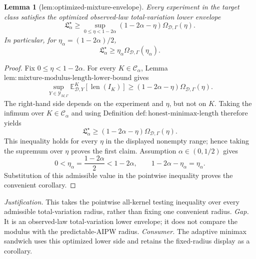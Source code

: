 \documentclass{article}
\newtheorem{lemma}{Lemma}
\begin{document}
\begin{lemma}[lem:optimized-mixture-envelope]\label{lem:optimized-mixture-envelope}
Every experiment in the target class satisfies the optimized observed-law total-variation lower envelope
\[
 \mathfrak L_\alpha^\star
 \ge
 \sup_{0\le\eta<1-2\alpha}
 (1-2\alpha-\eta)\Omega_{\mathcal D,\Gamma}(\eta).
\]
In particular, for \(\eta_\alpha=(1-2\alpha)/2\),
\[
 \mathfrak L_\alpha^\star
 \ge \eta_\alpha\Omega_{\mathcal D,\Gamma}(\eta_\alpha).
\]
\end{lemma}
\begin{proof}
Fix \(0\le\eta<1-2\alpha\).  For every \(K\in\mathcal C_\alpha\), Lemma \(\mathrm{lem:mixture\text{-}modulus\text{-}length\text{-}lower\text{-}bound}\) gives
\[
 \sup_{Y\in\mathcal Y_{M,\Gamma}}
 \mathbb E^K_{\mathcal D,Y}[\operatorname{len}(I_K)]
 \ge
 (1-2\alpha-\eta)\Omega_{\mathcal D,\Gamma}(\eta).
\]
The right-hand side depends on the experiment and \(\eta\), but not on \(K\).  Taking the infimum over \(K\in\mathcal C_\alpha\) and using Definition \(\mathrm{def:honest\text{-}minimax\text{-}length}\) therefore yields
\[
 \mathfrak L_\alpha^\star
 \ge
 (1-2\alpha-\eta)\Omega_{\mathcal D,\Gamma}(\eta).
\]
This inequality holds for every \(\eta\) in the displayed nonempty range; hence taking the supremum over \(\eta\) proves the first claim.  Assumption \(\alpha\in(0,1/2)\) gives
\[
 0<\eta_\alpha=\frac{1-2\alpha}{2}<1-2\alpha,
 \qquad
 1-2\alpha-\eta_\alpha=\eta_\alpha.
\]
Substitution of this admissible value in the pointwise inequality proves the convenient corollary.
\end{proof}
\par\smallskip\noindent \textit{Justification.} This takes the pointwise all-kernel testing inequality over every admissible total-variation radius, rather than fixing one convenient radius. \textit{Gap.} It is an observed-law total-variation lower envelope; it does not compare the modulus with the predictable-AIPW radius. \textit{Consumer.} The adaptive minimax sandwich uses this optimized lower side and retains the fixed-radius display as a corollary.
\end{document}
